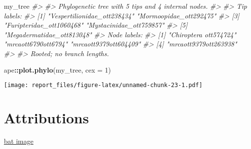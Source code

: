 \documentclass[]{article}
\newenvironment{Shaded}{\begin{snugshade}}{\end{snugshade}}
\newcommand{\CommentTok}[1]{\textcolor[rgb]{0.56,0.35,0.01}{\textit{#1}}}
\newcommand{\DataTypeTok}[1]{\textcolor[rgb]{0.13,0.29,0.53}{#1}}
\newcommand{\DecValTok}[1]{\textcolor[rgb]{0.00,0.00,0.81}{#1}}
\newcommand{\KeywordTok}[1]{\textcolor[rgb]{0.13,0.29,0.53}{\textbf{#1}}}
\newcommand{\NormalTok}[1]{#1}
\newcommand{\OperatorTok}[1]{\textcolor[rgb]{0.81,0.36,0.00}{\textbf{#1}}}
\begin{document}
\begin{Shaded}
\begin{Highlighting}[]
\NormalTok{my_tree}
\CommentTok{#> }
\CommentTok{#> Phylogenetic tree with 5 tips and 4 internal nodes.}
\CommentTok{#> }
\CommentTok{#> Tip labels:}
\CommentTok{#> [1] "Vespertilionidae_ott238434" "Mormoopidae_ott292475"     }
\CommentTok{#> [3] "Furipteridae_ott1060468"    "Mystacinidae_ott759857"    }
\CommentTok{#> [5] "Megadermatidae_ott813048"  }
\CommentTok{#> Node labels:}
\CommentTok{#> [1] "Chiroptera ott574724" "mrcaott6790ott6794"   "mrcaott9379ott604409"}
\CommentTok{#> [4] "mrcaott9379ott263938"}
\CommentTok{#> }
\CommentTok{#> Rooted; no branch lengths.}
\end{Highlighting}
\end{Shaded}

\begin{Shaded}
\begin{Highlighting}[]
\NormalTok{ape}\OperatorTok{::}\KeywordTok{plot.phylo}\NormalTok{(my_tree, }\DataTypeTok{cex =} \DecValTok{1}\NormalTok{)}
\end{Highlighting}
\end{Shaded}

\texttt{[image: report\_files/figure-latex/unnamed-chunk-23-1.pdf]}

\hypertarget{attributions}{%
\section{Attributions}\label{attributions}}

\href{https://unsplash.com/photos/hNz4Qh9ECCc}{bat image}
\end{document}
